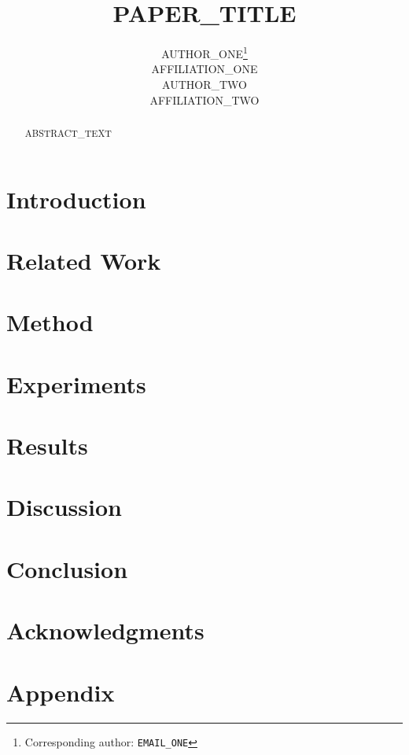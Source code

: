 \documentclass{article}
\title{PAPER\_TITLE}
\author{%
  AUTHOR\_ONE\thanks{Corresponding author: \texttt{EMAIL\_ONE}} \\
  AFFILIATION\_ONE \\
  \And
  AUTHOR\_TWO \\
  AFFILIATION\_TWO \\
}
\begin{document}
\maketitle

\begin{abstract}
ABSTRACT\_TEXT
\end{abstract}



\section{Introduction}
\label{sec:introduction}

\section{Related Work}
\label{sec:related-work}

\section{Method}
\label{sec:method}

\section{Experiments}
\label{sec:experiments}

\section{Results}
\label{sec:results}

\section{Discussion}
\label{sec:discussion}

\section{Conclusion}
\label{sec:conclusion}

\section*{Acknowledgments}




\appendix
\section{Appendix}
\label{sec:appendix}
\end{document}

